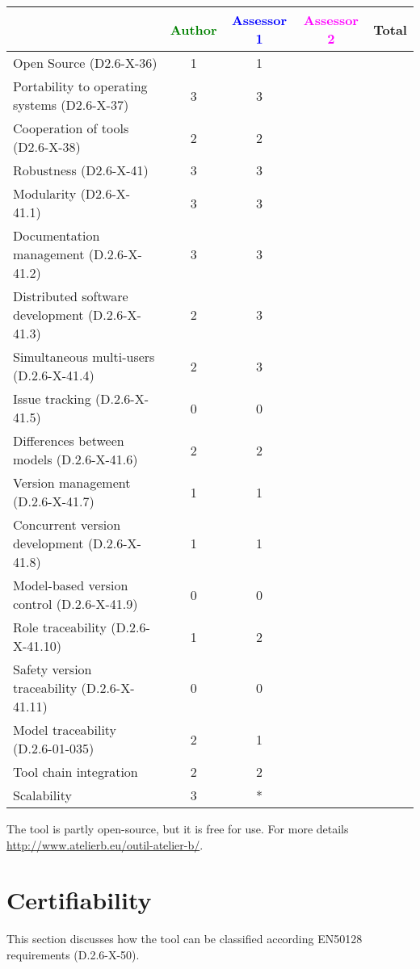 \begin{tabular}{|l | c | c | c | c|}
\hline
& \textcolor{green}{Author} & \textcolor{blue}{Assessor 1} & \textcolor{magenta}{Assessor 2} & Total \\
\hline 
Open Source (D2.6-X-36) & 1 & 1 & &  \\
\hline 
Portability to operating systems (D2.6-X-37) & 3 & 3 & &  \\
\hline
Cooperation of tools (D2.6-X-38) & 2 & 2 & &  \\
\hline
Robustness (D2.6-X-41) & 3 & 3 & & \\
\hline
Modularity (D2.6-X-41.1) & 3 & 3 & & \\
\hline
Documentation management (D.2.6-X-41.2) & 3 & 3 & & \\
\hline
Distributed software development (D.2.6-X-41.3)  & 2 & 3 & & \\
\hline
Simultaneous multi-users (D.2.6-X-41.4)   & 2 & 3 & & \\
\hline
Issue tracking (D.2.6-X-41.5) & 0 & 0 & & \\
\hline
Differences between models (D.2.6-X-41.6) & 2 & 2 & & \\
\hline
Version management (D.2.6-X-41.7) & 1 & 1 & & \\
\hline
Concurrent version development (D.2.6-X-41.8) & 1 & 1 & & \\
\hline
Model-based version control (D.2.6-X-41.9) & 0 & 0 & & \\
\hline
Role traceability (D.2.6-X-41.10) & 1 & 2 & & \\
\hline
Safety version traceability (D.2.6-X-41.11) & 0 & 0 & & \\
\hline
Model traceability (D.2.6-01-035) & 2 & 1 & & \\
\hline
Tool chain integration & 2 & 2 & & \\
\hline
Scalability & 3 & * & & \\
\hline
\end{tabular}

\begin{author_comment}
The tool is partly open-source, but it is free for use.
For more details \url{http://www.atelierb.eu/outil-atelier-b/}.
\end{author_comment}


\section{Certifiability}

This section discusses how the tool can be classified according EN50128 requirements (D.2.6-X-50).


